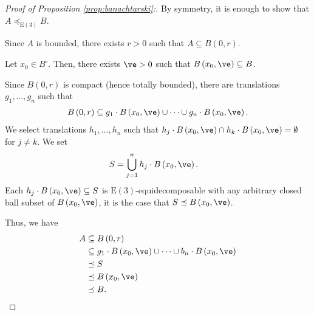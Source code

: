 \begin{proof}[Proof of Proposition \ref{prop:banachtarski}:]
  By symmetry, it is enough to show that $A\preceq_{\text{E}(3)} B$.\newline

  Since $A$ is bounded, there exists $r > 0$ such that $A\subseteq B(0,r)$.\newline

  Let $x_0\in B^{\circ}$. Then, there exists $\ve > 0$ such that $B\left(x_0,\ve\right) \subseteq B$.\newline

  Since $B(0,r)$ is compact (hence totally bounded), there are translations $g_1,\dots,g_n$ such that
  \begin{align*}
    B\left(0,r\right) \subseteq g_1\cdot B\left(x_0,\ve\right) \cup \cdots \cup g_n\cdot B\left(x_0,\ve\right).
  \end{align*}
  We select translations $h_1,\dots,h_n$ such that $h_j\cdot B\left(x_0,\ve\right) \cap h_k\cdot B\left(x_0,\ve\right) = \emptyset$ for $j\neq k$. We set
  \begin{align*}
    S &= \bigcup_{j=1}^{n}h_j\cdot B\left(x_0,\ve\right).
  \end{align*}
  Each $h_j\cdot B\left(x_0,\ve\right)\subseteq S$ is $\text{E}(3)$-equidecomposable with any arbitrary closed ball subset of $B\left(x_0,\ve\right)$, it is the case that $S\preceq B\left(x_0,\ve\right)$.\newline

  Thus, we have
  \begin{align*}
    A &\subseteq B\left(0,r\right)\\
      &\subseteq g_1\cdot B\left(x_0,\ve\right)\cup\cdots\cup b_n\cdot B\left(x_0,\ve\right)\\
      &\preceq S\\
      &\preceq B\left(x_0,\ve\right)\\
      &\preceq B.
  \end{align*}
\end{proof}

